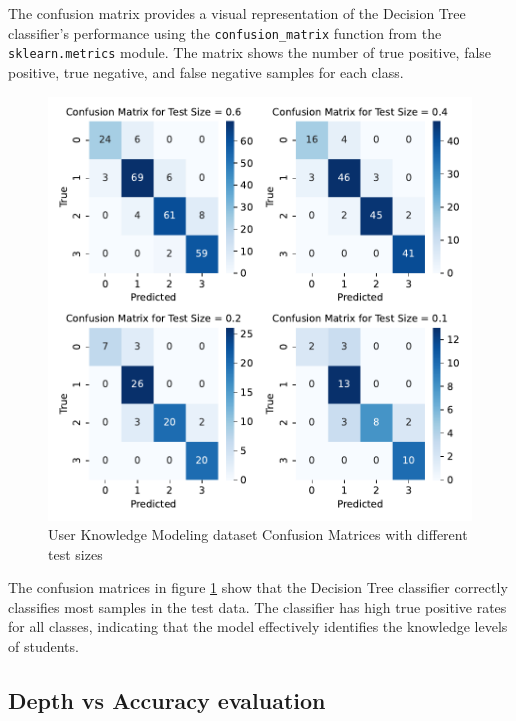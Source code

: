 The confusion matrix provides a visual representation of the Decision Tree classifier's performance using the \texttt{confusion\_matrix} function from the \texttt{sklearn.metrics} module. The matrix shows the number of true positive, false positive, true negative, and false negative samples for each class.

\begin{figure}[H]
    \centering
    \includegraphics[width=.7\textwidth]{figures/user_knowledge_modeling_confusion_matrices.pdf}
    \caption{User Knowledge Modeling dataset Confusion Matrices with different test sizes}
    \label{fig:user_knowledge_modeling_confusion_matrices}
\end{figure}

The confusion matrices in figure \ref{fig:user_knowledge_modeling_confusion_matrices} show that the Decision Tree classifier correctly classifies most samples in the test data. The classifier has high true positive rates for all classes, indicating that the model effectively identifies the knowledge levels of students.

\subsection{Depth vs Accuracy evaluation}

